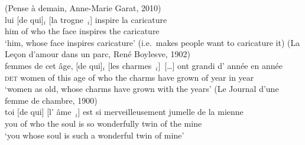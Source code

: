 \eal 
\ex (Pense à demain, Anne-Marie Garat, 2010)\\
\gll lui [de qui]$_i$ [la trogne~\trace{}$_i$] inspire la caricature\\
him of who the face inspires the caricature \\
\glt `him, whose face inspires caricature' (i.e.\ makes people want to caricature it)
\label{ex:dq2000-subj-trans}
\ex (La Leçon d'amour dans un parc, René Boylesve, 1902)\\
\gll [des] femmes de cet âge, [de qui]$_i$ [les charmes~\trace{}$_i$]~[\dots] ont grandi d' année en année\\
\textsc{det} women of this age of who the charms have grown of year in year\\
\glt `women as old, whose charms have grown with the years'
\label{ex:dq1900-subj-unerg}
\ex (Le Journal d'une femme de chambre, 1900)\nopagebreak\\
\gll toi [de qui] [l' âme~\trace{}$_i$] est si merveilleusement jumelle de la mienne\\
you of who the soul is so wonderfully twin of the mine\\
\glt `you whose soul is such a wonderful twin of mine'
\label{ex:dq1900-subj-state}
